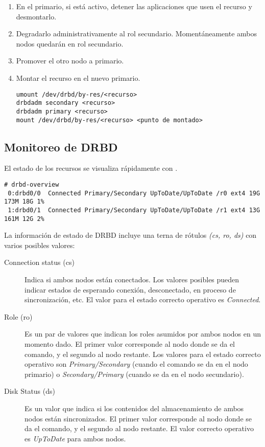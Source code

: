\begin{enumerate}
	\item En el primario, si está activo, detener las aplicaciones que usen el recurso y desmontarlo.
	\item Degradarlo administrativamente al rol secundario. Momentáneamente ambos nodos quedarán en rol secundario.
	\item Promover el otro nodo a primario.
	\item Montar el recurso en el nuevo primario.
	\begin{lstlisting}
umount /dev/drbd/by-res/<recurso>
drbdadm secondary <recurso>
drbdadm primary <recurso>
mount /dev/drbd/by-res/<recurso> <punto de montado>
\end{lstlisting}

\end{enumerate}


\subsection{Monitoreo de DRBD}

El estado de los recursos se visualiza rápidamente con .

\begin{lstlisting}
# drbd-overview 
 0:drbd0/0  Connected Primary/Secondary UpToDate/UpToDate /r0 ext4 19G 173M 18G 1% 
 1:drbd0/1  Connected Primary/Secondary UpToDate/UpToDate /r1 ext4 13G 161M 12G 2% 
\end{lstlisting}

La información de estado de DRBD incluye una terna de rótulos \textit{(cs, ro, ds)} con varios posibles valores:

\begin{description}
	\item[Connection status (cs)] Indica si ambos nodos están conectados. Los valores posibles pueden indicar estados de esperando conexión, desconectado, en proceso de sincronización, etc. El valor para el estado correcto operativo es \textit{Connected}. 

	\item[Role (ro)] Es un par de valores que indican los roles asumidos por ambos nodos en un momento dado. El primer valor corresponde al nodo donde se da el comando, y el segundo al nodo restante. Los valores para el estado correcto operativo son \textit{Primary/Secondary} (cuando el comando se da en el nodo primario) o \textit{Secondary/Primary} (cuando se da en el nodo secundario).

	\item[Disk Status (ds)] Es un valor que indica si los contenidos del almacenamiento de ambos nodos están sincronizados. El primer valor corresponde al nodo donde se da el comando, y el segundo al nodo restante. El valor correcto operativo es \textit{UpToDate} para ambos nodos.
 
\end{description}

